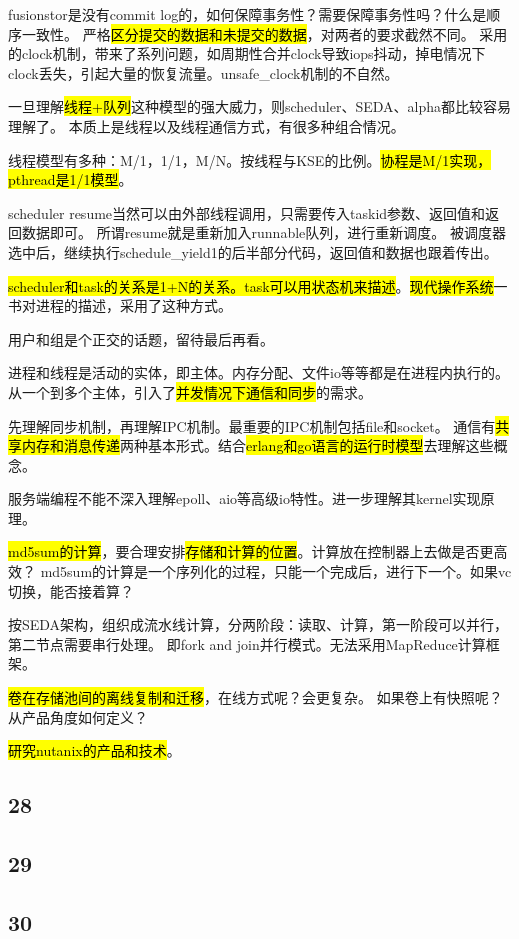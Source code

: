 fusionstor是没有commit log的，如何保障事务性？需要保障事务性吗？什么是顺序一致性。
严格\hl{区分提交的数据和未提交的数据}，对两者的要求截然不同。
采用的clock机制，带来了系列问题，如周期性合并clock导致iops抖动，掉电情况下clock丢失，引起大量的恢复流量。unsafe\_clock机制的不自然。

\dotfill

一旦理解\hl{线程+队列}这种模型的强大威力，则scheduler、SEDA、alpha都比较容易理解了。
本质上是线程以及线程通信方式，有很多种组合情况。

线程模型有多种：M/1，1/1，M/N。按线程与KSE的比例。\hl{协程是M/1实现，pthread是1/1模型}。

scheduler resume当然可以由外部线程调用，只需要传入taskid参数、返回值和返回数据即可。
所谓resume就是重新加入runnable队列，进行重新调度。
被调度器选中后，继续执行schedule\_yield1的后半部分代码，返回值和数据也跟着传出。

\hl{scheduler和task的关系是1+N的关系。task可以用状态机来描述}。\hl{现代操作系统}一书对进程的描述，采用了这种方式。

\dotfill

用户和组是个正交的话题，留待最后再看。

进程和线程是活动的实体，即主体。内存分配、文件io等等都是在进程内执行的。
从一个到多个主体，引入了\hl{并发情况下通信和同步}的需求。

先理解同步机制，再理解IPC机制。最重要的IPC机制包括file和socket。
通信有\hl{共享内存和消息传递}两种基本形式。结合\hl{erlang和go语言的运行时模型}去理解这些概念。

服务端编程不能不深入理解epoll、aio等高级io特性。进一步理解其kernel实现原理。

\hrulefill

\hl{md5sum的计算}，要合理安排\hl{存储和计算的位置}。计算放在控制器上去做是否更高效？
md5sum的计算是一个序列化的过程，只能一个完成后，进行下一个。如果vc切换，能否接着算？

按SEDA架构，组织成流水线计算，分两阶段：读取、计算，第一阶段可以并行，第二节点需要串行处理。
即fork and join并行模式。无法采用MapReduce计算框架。

\hl{卷在存储池间的离线复制和迁移}，在线方式呢？会更复杂。
如果卷上有快照呢？从产品角度如何定义？

\hrulefill

\hl{研究nutanix的产品和技术}。

\subsection{28}

\subsection{29}

\subsection{30}
